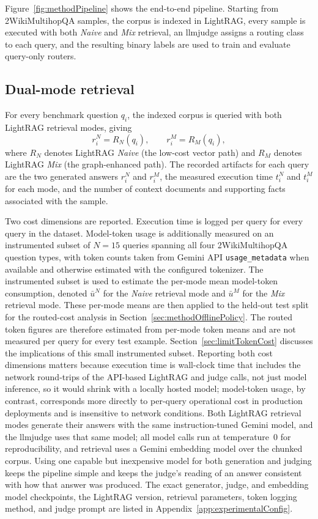 \documentclass[english, bibtex]{kththesis}               %
\numberwithin{listing}{chapter}
\begin{document}
Figure~\ref{fig:methodPipeline} shows the end-to-end pipeline. Starting from 2WikiMultihopQA samples, the corpus is indexed in LightRAG, every sample is executed with both \emph{Naive} and \emph{Mix} retrieval, an \gls{llmjudge} assigns a routing class to each query, and the resulting binary labels are used to train and evaluate query-only routers.

\subsection{Dual-mode retrieval}
\label{sec:methodDualMode}

For every benchmark question \(q_i\), the indexed corpus is queried with both LightRAG retrieval modes, giving
\begin{equation}
\label{eq:dualModeOutputs}
r_i^{N} = R_N(q_i),
\qquad
r_i^{M} = R_M(q_i),
\end{equation}
where \(R_N\) denotes LightRAG \emph{Naive} (the low-cost vector path) and \(R_M\) denotes LightRAG \emph{Mix} (the graph-enhanced path). The recorded artifacts for each query are the two generated answers \(r_i^N\) and \(r_i^M\), the measured execution time \(t_i^N\) and \(t_i^M\) for each mode, and the number of context documents and supporting facts associated with the sample.

Two cost dimensions are reported. Execution time is logged per query for every query in the dataset. Model-token usage is additionally measured on an instrumented subset of \(N = 15\) queries spanning all four 2WikiMultihopQA question types, with token counts taken from Gemini API \texttt{usage\_metadata} when available and otherwise estimated with the configured tokenizer. The instrumented subset is used to estimate the per-mode mean model-token consumption, denoted $\bar{u}^N$ for the \emph{Naive} retrieval mode and $\bar{u}^M$ for the \emph{Mix} retrieval mode. These per-mode means are then applied to the held-out test split for the routed-cost analysis in Section~\ref{sec:methodOfflinePolicy}. The routed token figures are therefore estimated from per-mode token means and are not measured per query for every test example. Section~\ref{sec:limitTokenCost} discusses the implications of this small instrumented subset. Reporting both cost dimensions matters because execution time is wall-clock time that includes the network round-trips of the API-based LightRAG and judge calls, not just model inference, so it would shrink with a locally hosted model; model-token usage, by contrast, corresponds more directly to per-query operational cost in production deployments and is insensitive to network conditions. Both LightRAG retrieval modes generate their answers with the same instruction-tuned Gemini model, and the \gls{llmjudge} uses that same model; all model calls run at temperature~$0$ for reproducibility, and retrieval uses a Gemini embedding model over the chunked corpus. Using one capable but inexpensive model for both generation and judging keeps the pipeline simple and keeps the judge's reading of an answer consistent with how that answer was produced. The exact generator, judge, and embedding model checkpoints, the LightRAG version, retrieval parameters, token logging method, and judge prompt are listed in Appendix~\ref{app:experimentalConfig}.
\end{document}
